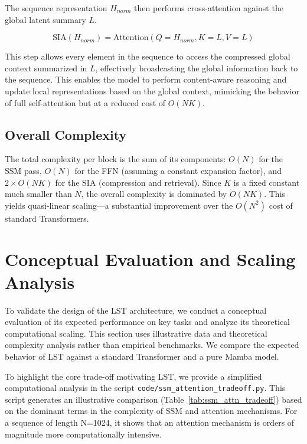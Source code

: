 \documentclass[10pt,twocolumn,letterpaper]{article}
\begin{document}
The sequence representation \(H_{norm}\) then performs cross-attention against the global latent summary \(L\).

\begin{equation}
\text{SIA}(H_{norm}) = \text{Attention}(Q=H_{norm}, K=L, V=L)
\end{equation}

This step allows every element in the sequence to access the compressed global context summarized in \(L\), effectively broadcasting the global information back to the sequence. This enables the model to perform content-aware reasoning and update local representations based on the global context, mimicking the behavior of full self-attention but at a reduced cost of \(O(NK)\).

\subsection{Overall Complexity}

The total complexity per block is the sum of its components: \(O(N)\) for the SSM pass, \(O(N)\) for the FFN (assuming a constant expansion factor), and \(2\times O(NK)\) for the SIA (compression and retrieval). Since \(K\) is a fixed constant much smaller than \(N\), the overall complexity is dominated by \(O(NK)\). This yields quasi-linear scaling—a substantial improvement over the \(O(N^{2})\) cost of standard Transformers.

\section{Conceptual Evaluation and Scaling Analysis}

To validate the design of the LST architecture, we conduct a conceptual evaluation of its expected performance on key tasks and analyze its theoretical computational scaling. This section uses illustrative data and theoretical complexity analysis rather than empirical benchmarks. We compare the expected behavior of LST against a standard Transformer and a pure Mamba model.

To highlight the core trade-off motivating LST, we provide a simplified computational analysis in the script \texttt{code/ssm\_attention\_tradeoff.py}. This script generates an illustrative comparison (Table~\ref{tab:ssm_attn_tradeoff}) based on the dominant terms in the complexity of SSM and attention mechanisms. For a sequence of length N=1024, it shows that an attention mechanism is orders of magnitude more computationally intensive.
\end{document}
